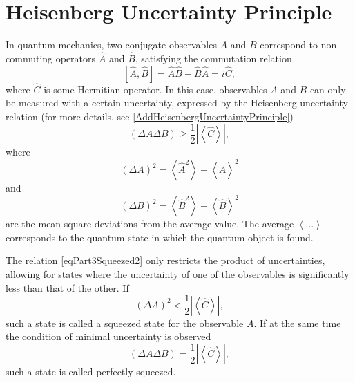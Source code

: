 \section{Heisenberg Uncertainty Principle}
In quantum mechanics, two conjugate observables $A$ and $B$
correspond to non-commuting operators $\hat{A}$ and $\hat{B}$,
satisfying the commutation relation
\begin{equation}
\left[
\hat{A}, \hat{B}
\right] = 
\hat{A}\hat{B} - \hat{B}\hat{A} = i \hat{C},
\nonumber
\end{equation}
where $\hat{C}$ is some Hermitian operator. In this case, observables
$A$ and $B$ can only be measured with a certain uncertainty,
expressed by the Heisenberg uncertainty relation
(for more details, see \autoref{AddHeisenbergUncertaintyPrinciple})
\begin{equation}
\left(
\Delta A \Delta B
\right) \ge \frac{1}{2} \left|\left<\hat{C}\right>\right|,
\label{eqPart3Squeezed2}
\end{equation}
where
\[
\left(\Delta A\right)^2 = \left<\hat{A}^2\right> - \left<\hat{A}\right>^2
\]
and
\[
\left(\Delta B\right)^2 = \left<\hat{B}^2\right> - \left<\hat{B}\right>^2
\]
are the mean square deviations from the average value.
The average $\left<\dots\right>$ corresponds to the quantum state in
which the quantum object is found.

The relation \eqref{eqPart3Squeezed2} only restricts the product
of uncertainties, allowing for states where the uncertainty
of one of the observables is significantly less than that of the other.
If 
\begin{equation}
\left(\Delta A\right)^2 < \frac{1}{2} \left|\left<\hat{C}\right>\right|,
\nonumber
\end{equation}
such a state is called a squeezed state for the observable
$A$. If at the same time the condition of minimal uncertainty is observed
\begin{equation}
\left(
\Delta A \Delta B
\right) = \frac{1}{2} \left|\left<\hat{C}\right>\right|,
\nonumber
\end{equation}
such a state is called perfectly squeezed.